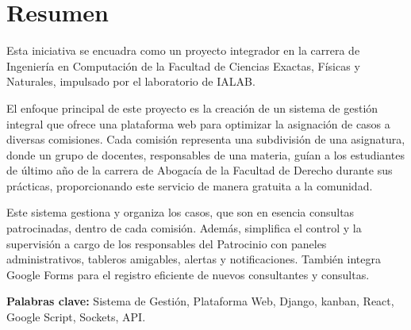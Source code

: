 \chapter*{Resumen}
Esta iniciativa se encuadra como un proyecto integrador en la carrera de Ingeniería en Computación de la Facultad de Ciencias Exactas, Físicas y Naturales, impulsado por el laboratorio de IALAB.

El enfoque principal de este proyecto es la creación de un sistema de gestión integral que ofrece una plataforma web para optimizar la asignación de casos a diversas comisiones. Cada comisión representa una subdivisión de una asignatura, donde un grupo de docentes, responsables de una materia, guían a los estudiantes de último año de la carrera de Abogacía de la Facultad de Derecho durante sus prácticas, proporcionando este servicio de manera gratuita a la comunidad.

Este sistema gestiona y organiza los casos, que son en esencia consultas patrocinadas, dentro de cada comisión. Además, simplifica el control y la supervisión a cargo de los responsables del Patrocinio con paneles administrativos, tableros amigables, alertas y notificaciones. También integra Google Forms para el registro eficiente de nuevos consultantes y consultas.

\vspace{.5cm}

\textbf{Palabras clave:} Sistema de Gestión, Plataforma Web, Django, kanban, React, Google Script, Sockets, API.